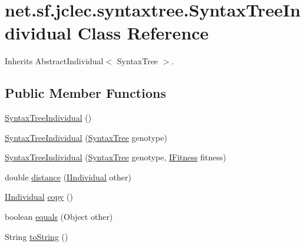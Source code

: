 \hypertarget{classnet_1_1sf_1_1jclec_1_1syntaxtree_1_1_syntax_tree_individual}{\section{net.\-sf.\-jclec.\-syntaxtree.\-Syntax\-Tree\-Individual Class Reference}
\label{classnet_1_1sf_1_1jclec_1_1syntaxtree_1_1_syntax_tree_individual}
}


Inherits Abstract\-Individual$<$ Syntax\-Tree $>$.

\subsection*{Public Member Functions}
\begin{DoxyCompactItemize}
\item 
\hyperlink{classnet_1_1sf_1_1jclec_1_1syntaxtree_1_1_syntax_tree_individual_aeb59dde1a77691f114b2ea8b6f9302db}{Syntax\-Tree\-Individual} ()
\item 
\hyperlink{classnet_1_1sf_1_1jclec_1_1syntaxtree_1_1_syntax_tree_individual_a47cfbbd5496d5571251a48e558a240f7}{Syntax\-Tree\-Individual} (\hyperlink{classnet_1_1sf_1_1jclec_1_1syntaxtree_1_1_syntax_tree}{Syntax\-Tree} genotype)
\item 
\hyperlink{classnet_1_1sf_1_1jclec_1_1syntaxtree_1_1_syntax_tree_individual_a588b6393fde9aec2552a025e24bfd56e}{Syntax\-Tree\-Individual} (\hyperlink{classnet_1_1sf_1_1jclec_1_1syntaxtree_1_1_syntax_tree}{Syntax\-Tree} genotype, \hyperlink{interfacenet_1_1sf_1_1jclec_1_1_i_fitness}{I\-Fitness} fitness)
\item 
double \hyperlink{classnet_1_1sf_1_1jclec_1_1syntaxtree_1_1_syntax_tree_individual_a97a9f47a092aeb4ccb332f735b7b9fc2}{distance} (\hyperlink{interfacenet_1_1sf_1_1jclec_1_1_i_individual}{I\-Individual} other)
\item 
\hyperlink{interfacenet_1_1sf_1_1jclec_1_1_i_individual}{I\-Individual} \hyperlink{classnet_1_1sf_1_1jclec_1_1syntaxtree_1_1_syntax_tree_individual_affba349fa4338aa55e87a636a842cdea}{copy} ()
\item 
boolean \hyperlink{classnet_1_1sf_1_1jclec_1_1syntaxtree_1_1_syntax_tree_individual_a182a29dcdfe4f51b75feb7bc510851a5}{equals} (Object other)
\item 
String \hyperlink{classnet_1_1sf_1_1jclec_1_1syntaxtree_1_1_syntax_tree_individual_a890155b925b2f68ebc9eacc1a8cfdaf3}{to\-String} ()
\end{DoxyCompactItemize}



